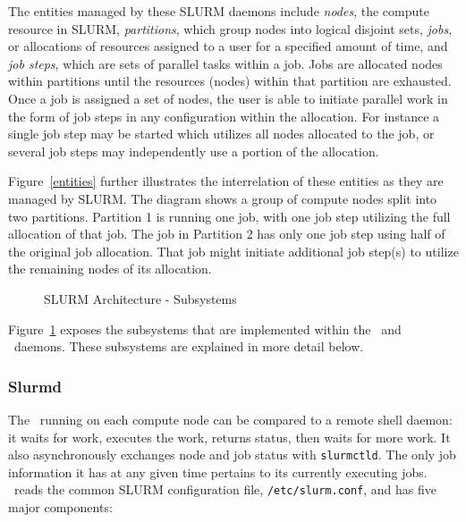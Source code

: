 The entities managed by these SLURM daemons include {\em nodes}, the
compute resource in SLURM, {\em partitions}, which group nodes into
logical disjoint sets, {\em jobs}, or allocations of resources assigned
to a user for a specified amount of time, and {\em job steps}, which are
sets of parallel tasks within a job.  Jobs are allocated nodes within 
partitions until the resources (nodes) within that partition are exhausted. 
Once a job is assigned a set of nodes, the user is able to initiate
parallel work in the form of job steps in any configuration within the
allocation. For instance a single job step may be started which utilizes
all nodes allocated to the job, or several job steps may independently 
use a portion of the allocation.

Figure~\ref{entities} further illustrates the interrelation of these
entities as they are managed by SLURM. The diagram shows a group of
compute nodes split into two partitions. Partition 1 is running one
job, with one job step utilizing the full allocation of that job.
The job in Partition 2 has only one job step using half of the original
job allocation.
That job might initiate additional job step(s) to utilize 
the remaining nodes of its allocation.

\begin{figure}[tb]
\centerline{}
\caption{SLURM Architecture - Subsystems}
\label{archdetail}
\end{figure}

Figure~\ref{archdetail} exposes the subsystems that are implemented
within the \slurmd\ and \slurmctld\ daemons.  These subsystems
are explained in more detail below.

\subsubsection{Slurmd}

The \slurmd\ running on each compute node can be compared to a remote
shell daemon:  it waits for work, executes the work, returns status,
then waits for more work.  It also asynchronously exchanges node and job
status with {\tt slurmctld}.  The only job information it has at any given 
time pertains to its currently executing jobs.
\slurmd\ reads the common SLURM configuration file, {\tt /etc/slurm.conf},
and has five major components:

